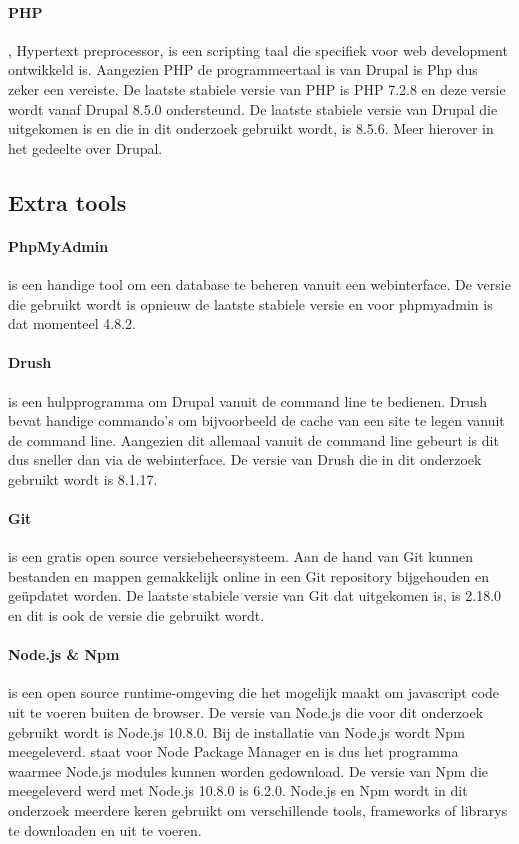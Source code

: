 \paragraph{PHP}
\textcite{PHP}, Hypertext preprocessor, is een scripting taal die specifiek voor web development ontwikkeld is. Aangezien PHP de programmeertaal is van Drupal is Php dus zeker een vereiste. De laatste stabiele versie van PHP is PHP 7.2.8 en deze versie wordt vanaf Drupal 8.5.0 ondersteund. De laatste stabiele versie van Drupal die uitgekomen is en die in dit onderzoek gebruikt wordt, is 8.5.6. Meer hierover in het gedeelte over Drupal.

\subsection{Extra tools}
\paragraph{PhpMyAdmin}
\textcite{PhpMyAdmin} is een handige \gls{tool} om een database te beheren vanuit een webinterface. De versie die gebruikt wordt is opnieuw de laatste stabiele versie en voor phpmyadmin is dat momenteel 4.8.2.

\paragraph{Drush}
\textcite{Drush} is een hulpprogramma om Drupal vanuit de command line te bedienen. Drush bevat handige commando's om bijvoorbeeld de cache van een site te legen vanuit de command line. Aangezien dit allemaal vanuit de command line gebeurt is dit dus sneller dan via de webinterface. De versie van Drush die in dit onderzoek gebruikt wordt is 8.1.17.

\paragraph{Git}
\textcite{Git} is een gratis open source versiebeheersysteem. Aan de hand van Git kunnen bestanden en mappen gemakkelijk online in een Git repository bijgehouden en geüpdatet worden. De laatste stabiele versie van Git dat uitgekomen is, is 2.18.0 en dit is ook de versie die gebruikt wordt.

\paragraph{Node.js \& Npm}
\textcite{Node} is een open source runtime-omgeving die het mogelijk maakt om javascript code uit te voeren buiten de browser. De versie van Node.js die voor dit onderzoek gebruikt wordt is Node.js 10.8.0. Bij de installatie van Node.js wordt Npm meegeleverd. \textcite{Npm} staat voor Node Package Manager en is dus het programma waarmee Node.js modules kunnen worden gedownload. De versie van Npm die meegeleverd werd met Node.js 10.8.0 is 6.2.0. Node.js en Npm wordt in dit onderzoek meerdere keren gebruikt om verschillende \glspl{tool}, \glspl{framework} of \glspl{library} te downloaden en uit te voeren.

